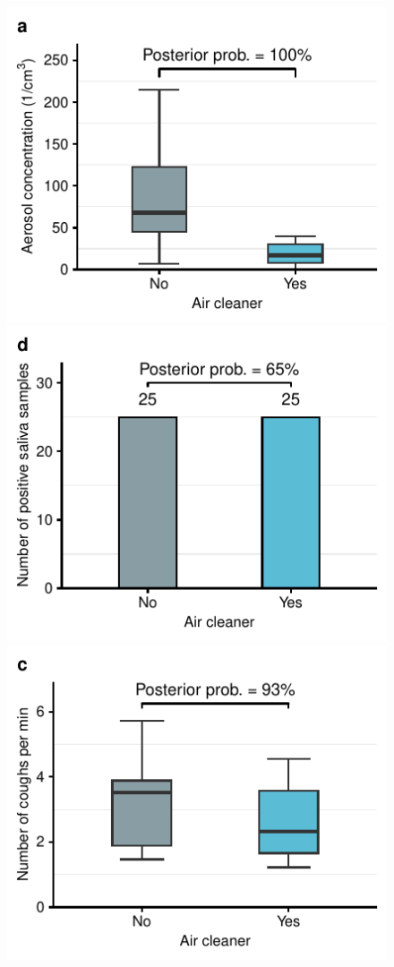 \documentclass[fleqn,11pt]{wlscirep}
\begin{document}
\begin{figure}[!htpb]
\centering
    \includegraphics{../../results/env-data/aerosol-number-boxplot.pdf}\hspace{.5cm}
    \includegraphics{../../results/mol-data/saliva-by-study-condition.pdf}
    \includegraphics{../../results/cough-data/coughs-frequency-by-condition.pdf}\hspace{.5cm}

\end{figure}
\end{document}
